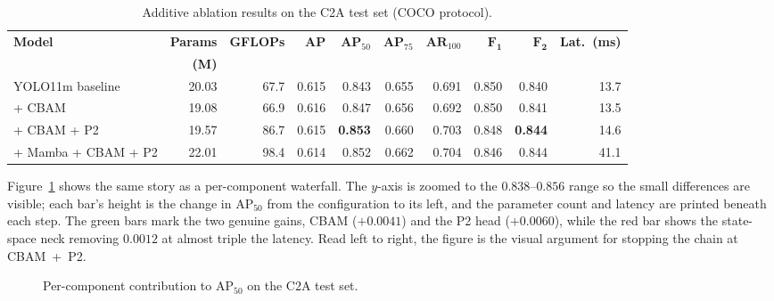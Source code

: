 \begin{table}[H]
  \centering
  \caption{Additive ablation results on the C2A test set (COCO protocol).}
  \label{tab:main}
  \small
  \setlength{\tabcolsep}{3pt}
  \begin{tabular}{@{}l r r r r r r r r r@{}}
    \toprule
    \textbf{Model} & \textbf{Params} & \textbf{GFLOPs} & \textbf{AP} & \textbf{$\mathbf{AP}_{50}$} & \textbf{$\mathbf{AP}_{75}$} & \textbf{$\mathbf{AR}_{100}$} & \textbf{$\symbf{F_1}$} & \textbf{$\symbf{F_2}$} & \textbf{Lat.\ (ms)} \\
     & \textbf{(M)} &  &  &  &  &  &  &  &  \\
    \midrule
    YOLO11m baseline    & 20.03 & 67.7 & 0.615 & 0.843 & 0.655 & 0.691 & 0.850 & 0.840 & 13.7 \\
    + CBAM              & 19.08 & 66.9 & 0.616 & 0.847 & 0.656 & 0.692 & 0.850 & 0.841 & 13.5 \\
    + CBAM + P2         & 19.57 & 86.7 & 0.615 & \textbf{0.853} & 0.660 & 0.703 & 0.848 & \textbf{0.844} & 14.6 \\
    + Mamba + CBAM + P2 & 22.01 & 98.4 & 0.614 & 0.852 & 0.662 & 0.704 & 0.846 & 0.844 & 41.1 \\
    \bottomrule
  \end{tabular}
\end{table}

Figure~\ref{fig:waterfall} shows the same story as a per-component waterfall.
The $y$-axis is zoomed to the $0.838$--$0.856$ range so the small differences
are visible; each bar's height is the change in $\mathrm{AP}_{50}$ from the
configuration to its left, and the parameter count and latency are printed
beneath each step. The green bars mark the two genuine gains, CBAM
($+0.0041$) and the P2 head ($+0.0060$), while the red bar shows the
state-space neck removing $0.0012$ at almost triple the latency. Read left to
right, the figure is the visual argument for stopping the chain at
CBAM~+~P2.

\begin{figure}[H]
  \centering
  
  \caption{Per-component contribution to $\mathrm{AP}_{50}$ on the C2A test set.}
  \label{fig:waterfall}
\end{figure}

